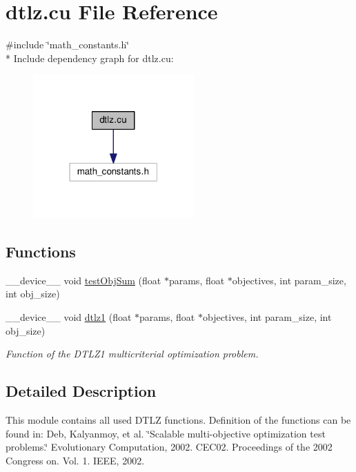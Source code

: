 \hypertarget{dtlz_8cu}{}\section{dtlz.\+cu File Reference}
\label{dtlz_8cu}
{\ttfamily \#include \char`\"{}math\+\_\+constants.\+h\char`\"{}}\\*
Include dependency graph for dtlz.\+cu\+:\nopagebreak
\begin{figure}[H]
\begin{center}
\leavevmode
\includegraphics[width=175pt]{dtlz_8cu__incl}
\end{center}
\end{figure}
\subsection*{Functions}
\begin{DoxyCompactItemize}
\item 
\+\_\+\+\_\+device\+\_\+\+\_\+ void \hyperlink{dtlz_8cu_af665aa59f6d550787a3da256e11ca075}{test\+Obj\+Sum} (float $\ast$params, float $\ast$objectives, int param\+\_\+size, int obj\+\_\+size)
\item 
\+\_\+\+\_\+device\+\_\+\+\_\+ void \hyperlink{dtlz_8cu_acb7db8f8aa7dde56b645cf50934148e4}{dtlz1} (float $\ast$params, float $\ast$objectives, int param\+\_\+size, int obj\+\_\+size)
\begin{DoxyCompactList}\small\item\em Function of the D\+T\+L\+Z1 multicriterial optimization problem. \end{DoxyCompactList}\end{DoxyCompactItemize}


\subsection{Detailed Description}
This module contains all used D\+T\+LZ functions. Definition of the functions can be found in\+: Deb, Kalyanmoy, et al. \char`\"{}\+Scalable multi-\/objective optimization test problems.\char`\"{} Evolutionary Computation, 2002. C\+EC\textquotesingle{}02. Proceedings of the 2002 Congress on. Vol. 1. I\+E\+EE, 2002. 

